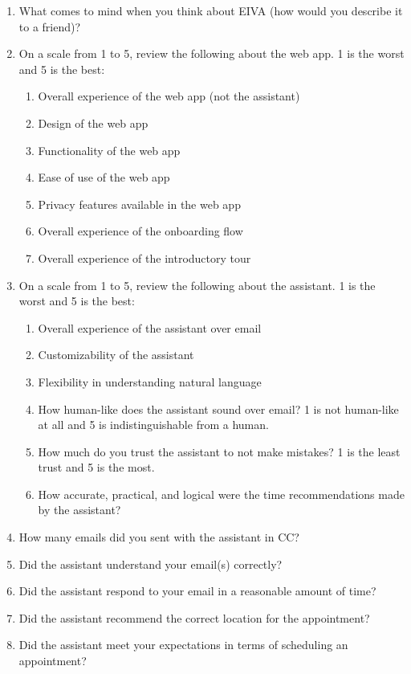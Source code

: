 \documentclass{article}
\begin{document}
\begin{enumerate}
	\item What comes to mind when you think about EIVA (how would you describe it to a friend)?
	\item On a scale from 1 to 5, review the following about the web app. 1 is the worst and 5 is the best:
	      \begin{enumerate}
	      	\item Overall experience of the web app (not the assistant)
	      	\item Design of the web app
	      	\item Functionality of the web app
	      	\item Ease of use of the web app
	      	\item Privacy features available in the web app
	      	\item Overall experience of the onboarding flow
	      	\item Overall experience of the introductory tour
	      \end{enumerate}
	\item On a scale from 1 to 5, review the following about the assistant. 1 is the worst and 5 is the best:
	      \begin{enumerate}
	      	\item Overall experience of the assistant over email
	      	\item Customizability of the assistant
	      	\item Flexibility in understanding natural language
	      	\item How human-like does the assistant sound over email? 1 is not human-like at all and 5 is indistinguishable from a human.
	      	\item How much do you trust the assistant to not make mistakes? 1 is the least trust and 5 is the most.
	      	\item How accurate, practical, and logical were the time recommendations made by the assistant?
	      \end{enumerate}
	\item How many emails did you sent with the assistant in CC?
	\item Did the assistant understand your email(s) correctly?
	\item Did the assistant respond to your email in a reasonable amount of time?
	\item Did the assistant recommend the correct location for the appointment?
	\item Did the assistant meet your expectations in terms of scheduling an appointment?

\end{enumerate}
\end{document}
